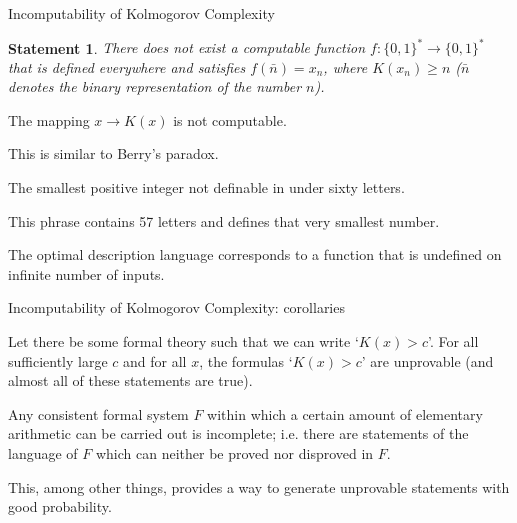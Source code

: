 \documentclass[
aspectratio=169]{beamer}
\newtheorem{statement}{Statement}
\newcommand{\bits}{\{0,1\}}
\newcommand{\bitstr}{\bits^*}
\begin{document}
\begin{frame}{Incomputability of Kolmogorov Complexity}
    \begin{statement}
        There does not exist a computable function $f:\bitstr\to\bitstr$ that is
        defined everywhere and satisfies $f(\bar n) = x_n$, where $K(x_n) \ge n$ ($\bar n$ denotes the binary representation of the number $n$).
    \end{statement}
\pause
\begin{corollary}
    The mapping $x \to K(x)$ is not computable.
\end{corollary}
\pause
    This is similar to Berry's paradox.
\begin{center}
    The smallest positive integer not definable in under sixty letters.
\end{center}
This phrase contains 57 letters and defines that very smallest number.
\pause
\begin{corollary}
The optimal description language corresponds to a function that is undefined on infinite number of inputs.
\end{corollary}
\end{frame}

\begin{frame}{Incomputability of Kolmogorov Complexity: corollaries}
\begin{corollary}
    Let there be some formal theory such that we can write `$K(x) > c$'. For all sufficiently large $c$ and for all $x$, the formulas `$K(x) > c$' are unprovable (and almost all of these statements are true).
\end{corollary}

\begin{corollary}
    Any consistent formal system $F$ within which a certain amount of elementary arithmetic can be carried out is incomplete; i.e. there are statements of the language of $F$ which can neither be proved nor disproved in $F$.
\end{corollary}

This, among other things, provides a way to generate unprovable statements with good probability.

\end{frame}
\end{document}
